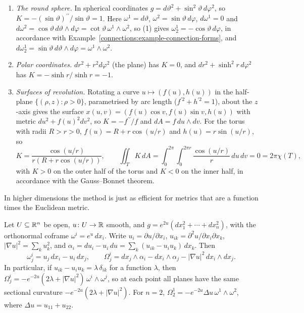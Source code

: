 \begin{example}\label{riemannian-geometry:example-frames-surfaces}
\begin{enumerate}
\item \emph{The round sphere.} In spherical coordinates $g = d\vartheta^2 + \sin^2\vartheta\,d\varphi^2$, so $K = -(\sin\vartheta)^{\prime\prime}/\sin\vartheta = 1$. Here $\omega^1 = d\vartheta$,
$\omega^2 = \sin\vartheta\,d\varphi$, $d\omega^1 = 0$ and $d\omega^2 = \cos\vartheta\,d\vartheta \wedge d\varphi = \cot\vartheta\,\omega^1 \wedge \omega^2$, so (1) gives $\omega^1_2 = -\cos\vartheta\,d\varphi$, in
accordance with Example~\ref{connections:example-connection-forms}, and $d\omega^1_2 = \sin\vartheta\,d\vartheta \wedge d\varphi = \omega^1 \wedge \omega^2$.
\item \emph{Polar coordinates.} $dr^2 + r^2d\varphi^2$ (the plane) has $K = 0$, and $dr^2 + \sinh^2r\,d\varphi^2$ has $K = -\sinh r/\sinh r = -1$.
\item \emph{Surfaces of revolution.} Rotating a curve $u \mapsto (f(u), h(u))$ in the half-plane $\{(\rho, z) : \rho > 0\}$, parametrised by arc length ($f^{\prime2} + h^{\prime2} = 1$),
about the $z$-axis gives the surface $x(u, v) = (f(u)\cos v, f(u)\sin v, h(u))$ with metric $du^2 + f(u)^2dv^2$, so $K = -f^{\prime\prime}/f$ and $dA = f\,du \wedge dv$. For the torus with radii
$R > r > 0$, $f(u) = R + r\cos(u/r)$ and $h(u) = r\sin(u/r)$, so
\[
K = \frac{\cos(u/r)}{r(R + r\cos(u/r))}, \qquad \iint_TK\,dA = \int_0^{2\pi}\!\!\int_0^{2\pi r}\frac{\cos(u/r)}{r}\,du\,dv = 0 = 2\pi\chi(T),
\]
with $K > 0$ on the outer half of the torus and $K < 0$ on the inner half, in accordance with the Gauss--Bonnet theorem.
\end{enumerate}
\end{example}

In higher dimensions the method is just as efficient for metrics that are a function times the Euclidean metric.

\begin{proposition}\label{riemannian-geometry:proposition-conformally-flat}
Let $U \subseteq \mathbb{R}^n$ be open, $u \colon U \to \mathbb{R}$ smooth, and $g = e^{2u}(dx_1^2 + \cdots + dx_n^2)$, with the orthonormal coframe $\omega^i = e^u\,dx_i$. Write $u_i = \partial u/\partial x_i$,
$u_{ik} = \partial^2u/\partial x_i\partial x_k$, $|\nabla u|^2 = \sum_ku_k^2$, and $\alpha_i = du_i - u_i\,du = \sum_k(u_{ik} - u_iu_k)\,dx_k$. Then
\[
\omega^i_j = u_j\,dx_i - u_i\,dx_j, \qquad \Omega^i_j = dx_j \wedge \alpha_i - dx_i \wedge \alpha_j - |\nabla u|^2\,dx_i \wedge dx_j .
\]
In particular, if $u_{ik} - u_iu_k = \lambda\,\delta_{ik}$ for a function $\lambda$, then $\Omega^i_j = -e^{-2u}(2\lambda + |\nabla u|^2)\,\omega^i \wedge \omega^j$, so at each point all planes have the same sectional
curvature $-e^{-2u}(2\lambda + |\nabla u|^2)$. For $n = 2$, $\Omega^1_2 = -e^{-2u}\Delta u\,\omega^1 \wedge \omega^2$, where $\Delta u = u_{11} + u_{22}$.
\end{proposition}

